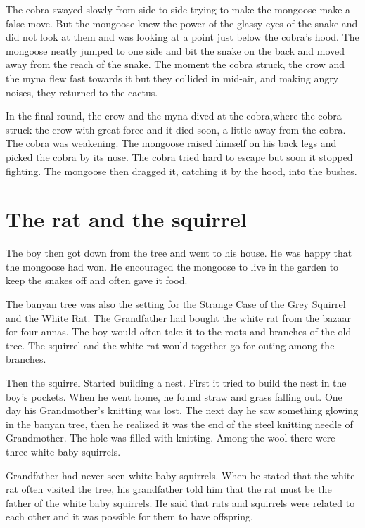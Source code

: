 \documentclass[a4paper,12pt]{book}
\begin{document}
The cobra swayed slowly from side to side trying to make the mongoose make a false move. But the mongoose knew the power of the glassy eyes of the snake and did not look at them and was looking at a point just below the cobra’s hood. The mongoose neatly jumped to one side and bit the snake on the back and moved away from the reach of the snake. The moment the cobra struck, the crow and the myna flew fast towards it but they collided in mid-air, and making angry noises, they returned to the cactus.

In the final round, the crow and the myna dived at the cobra,where the cobra struck the crow with great force and it died soon, a little away from the cobra. The cobra was weakening. The mongoose raised himself on his back legs and picked the cobra by its nose. The cobra tried hard to escape but soon it stopped fighting. The mongoose then dragged it, catching it by the hood, into the bushes.

\section{The rat and the squirrel}
\label{sec:orgba6e3ae}

The boy then got down from the tree and went to his house. He was happy that the mongoose had won. He encouraged the mongoose to live in the garden to keep the snakes off and often gave it food.

The banyan tree was also the setting for the Strange Case of the Grey Squirrel and the White Rat. The Grandfather had bought the white rat from the bazaar for four annas. The boy would often take it to the roots and branches of the old tree. The squirrel and the white rat would together go for outing among the branches.

Then the squirrel Started building a nest. First it tried to build the nest in the boy’s pockets. When he went home, he found straw and grass falling out. One day his Grandmother’s knitting was lost. The next day he saw something glowing in the banyan tree, then he realized it was the end of the steel knitting needle of Grandmother. The hole was filled with knitting. Among the wool there were three white baby squirrels.

Grandfather had never seen white baby squirrels. When he stated that the white rat often visited the tree, his grandfather told him that the rat must be the father of the white baby squirrels. He said that rats and squirrels were related to each other and it was possible for them to have offspring.
\end{document}
